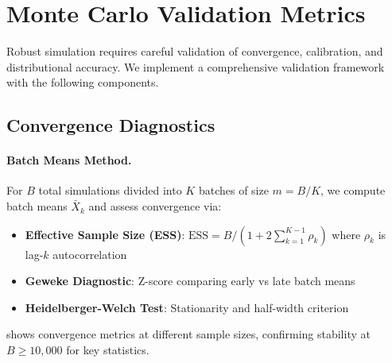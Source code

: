 \section{Monte Carlo Validation Metrics}
\label{sec:mc-validation}

Robust simulation requires careful validation of convergence, calibration, and distributional accuracy. We implement a comprehensive validation framework with the following components.

\subsection{Convergence Diagnostics}

\paragraph{Batch Means Method.}
For $B$ total simulations divided into $K$ batches of size $m = B/K$, we compute batch means $\bar{X}_k$ and assess convergence via:
\begin{itemize}
  \item \textbf{Effective Sample Size (ESS)}: $\text{ESS} = B / (1 + 2\sum_{k=1}^{K-1} \rho_k)$ where $\rho_k$ is lag-$k$ autocorrelation
  \item \textbf{Geweke Diagnostic}: Z-score comparing early vs late batch means
  \item \textbf{Heidelberger-Welch Test}: Stationarity and half-width criterion
\end{itemize}

 shows convergence metrics at different sample sizes, confirming stability at $B \geq 10,000$ for key statistics.


